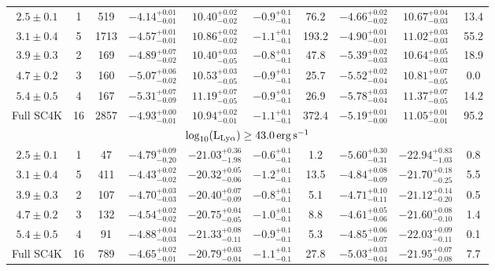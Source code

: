\documentclass[a4paper,fleqn,usenatbib]{mnras}
\begin{document}
\begin{table*}
\begin{tabular}{ccc | cccc | ccc}
\hline
$2.5\pm0.1$ & 1 & 519 & $-4.14^{+0.01}_{-0.01}$ & $10.40^{+0.02}_{-0.02}$ & $-0.9^{+0.1}_{-0.1}$ & 76.2 & $-4.66^{+0.02}_{-0.02}$ & $10.67^{+0.04}_{-0.03}$ & 13.4 \\
$3.1\pm0.4$ & 5 & 1713 & $-4.57^{+0.01}_{-0.01}$ & $10.86^{+0.02}_{-0.02}$ & $-1.1^{+0.1}_{-0.1}$ & 193.2 & $-4.90^{+0.01}_{-0.01}$ & $11.02^{+0.03}_{-0.03}$ & 55.2 \\
$3.9\pm0.3$ & 2 & 169 & $-4.89^{+0.07}_{-0.02}$ & $10.40^{+0.03}_{-0.05}$ & $-0.8^{+0.1}_{-0.1}$ & 47.8 & $-5.39^{+0.02}_{-0.03}$ & $10.64^{+0.05}_{-0.03}$ & 18.9 \\
$4.7\pm0.2$ & 3 & 160 & $-5.07^{+0.06}_{-0.02}$ & $10.53^{+0.03}_{-0.05}$ & $-0.9^{+0.1}_{-0.1}$ & 25.7 & $-5.52^{+0.02}_{-0.04}$ & $10.81^{+0.07}_{-0.05}$ & 0.0 \\
$5.4\pm0.5$ & 4 & 167 & $-5.31^{+0.07}_{-0.09}$ & $11.19^{+0.07}_{-0.05}$ & $-0.9^{+0.1}_{-0.1}$ & 26.9 & $-5.78^{+0.03}_{-0.04}$ & $11.37^{+0.07}_{-0.05}$ & 14.2 \\
Full SC4K & 16 & 2857 & $-4.93^{+0.00}_{-0.01}$ & $10.94^{+0.02}_{-0.01}$ & $-1.1^{+0.1}_{-0.1}$ & 372.4 & $-5.19^{+0.01}_{-0.00}$ & $11.05^{+0.01}_{-0.01}$ & 95.2 \\
\hline
\multicolumn{10}{c|}{$\log_{10} (\rm L_{Ly\alpha}) \geq 43.0\,erg\,s^{-1}$} \\
\hline
$2.5\pm0.1$ & 1 & 47 & $-4.79^{+0.09}_{-0.20}$ & $-21.03^{+0.36}_{-1.98}$ & $-0.6^{+0.1}_{-0.1}$ & 1.2 & $-5.60^{+0.30}_{-0.31}$ & $-22.94^{+0.83}_{-1.03}$ & 0.8 \\
$3.1\pm0.4$ & 5 & 411 & $-4.43^{+0.02}_{-0.02}$ & $-20.32^{+0.05}_{-0.06}$ & $-1.2^{+0.1}_{-0.1}$ & 13.5 & $-4.84^{+0.08}_{-0.09}$ & $-21.70^{+0.18}_{-0.25}$ & 5.5 \\
$3.9\pm0.3$ & 2 & 107 & $-4.70^{+0.03}_{-0.03}$ & $-20.40^{+0.07}_{-0.09}$ & $-0.8^{+0.1}_{-0.1}$ & 5.1 & $-4.71^{+0.10}_{-0.11}$ & $-21.12^{+0.14}_{-0.20}$ & 0.5 \\
$4.7\pm0.2$ & 3 & 132 & $-4.54^{+0.02}_{-0.02}$ & $-20.75^{+0.04}_{-0.05}$ & $-1.0^{+0.1}_{-0.1}$ & 8.8 & $-4.61^{+0.05}_{-0.06}$ & $-21.60^{+0.08}_{-0.10}$ & 1.4 \\
$5.4\pm0.5$ & 4 & 91 & $-4.88^{+0.04}_{-0.03}$ & $-21.33^{+0.08}_{-0.11}$ & $-0.9^{+0.1}_{-0.1}$ & 5.3 & $-4.85^{+0.06}_{-0.07}$ & $-22.03^{+0.09}_{-0.11}$ & 0.1 \\
Full SC4K & 16 & 789 & $-4.65^{+0.02}_{-0.01}$ & $-20.79^{+0.03}_{-0.04}$ & $-1.1^{+0.1}_{-0.1}$ & 27.8 & $-5.03^{+0.03}_{-0.04}$ & $-21.95^{+0.07}_{-0.08}$ & 7.7 \\
\hline\end{tabular}
\end{table*}
\end{document}
